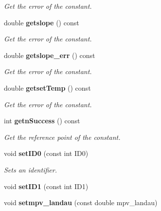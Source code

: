 \begin{DoxyCompactItemize}
\begin{DoxyCompactList}\small\item\em Get the error of the constant. \end{DoxyCompactList}\item 
double {\bf getslope} () const \label{classCALICE_1_1ScECALMIPfit_a3cc2ee6c39ecb05eff8b42d677326e3a}

\begin{DoxyCompactList}\small\item\em Get the error of the constant. \end{DoxyCompactList}\item 
double {\bf getslope\-\_\-err} () const \label{classCALICE_1_1ScECALMIPfit_ae7dd36b75577b625bdc5e9ff4a190559}

\begin{DoxyCompactList}\small\item\em Get the error of the constant. \end{DoxyCompactList}\item 
double {\bf getset\-Temp} () const \label{classCALICE_1_1ScECALMIPfit_afb9be9a27dc0bb69da904dc1cf595cf4}

\begin{DoxyCompactList}\small\item\em Get the error of the constant. \end{DoxyCompactList}\item 
int {\bf getn\-Success} () const \label{classCALICE_1_1ScECALMIPfit_a2bf9a88ad2a672f5072f05e3d04cd75c}

\begin{DoxyCompactList}\small\item\em Get the reference point of the constant. \end{DoxyCompactList}\item 
void {\bf set\-I\-D0} (const int I\-D0)\label{classCALICE_1_1ScECALMIPfit_a6a1520a84d1f9ef8757ba0b2e9a919f2}

\begin{DoxyCompactList}\small\item\em Sets an identifier. \end{DoxyCompactList}\item 
void {\bfseries set\-I\-D1} (const int I\-D1)\label{classCALICE_1_1ScECALMIPfit_a7f60fc8bcc590ff732b64a9f4cef7a18}

\item 
void {\bf setmpv\-\_\-landau} (const double mpv\-\_\-landau)\label{classCALICE_1_1ScECALMIPfit_a30e0f590d9a913e0dc6ccca41bfff98d}


\end{DoxyCompactItemize}

